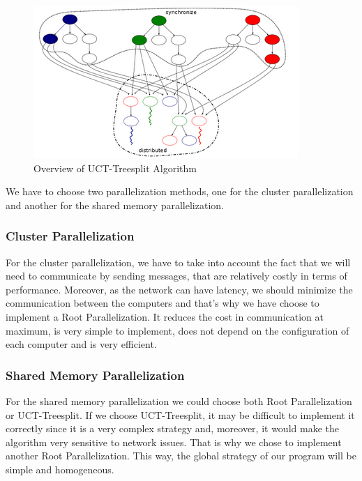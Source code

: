 \begin{figure}[!h] 
\centerline{\includegraphics[scale=0.80]{3Methods/3.1Parallelization_Method/treesplit.png}}
   \caption{Overview of UCT-Treesplit Algorithm}
\label{fig:treesplit}
\end{figure}


We have to choose two parallelization methods, one for the cluster parallelization and another for the shared memory parallelization.
\subsubsection{Cluster Parallelization}
For the cluster parallelization, we have to take into account the fact that we will need to communicate by sending messages, that are relatively costly in terms of performance.
Moreover, as the network can have latency, we should minimize the communication between the computers and that's why we have choose to implement a Root Parallelization.
It reduces the cost in communication at maximum, is very simple to implement, does not depend on the configuration of each computer and is very efficient.
\subsubsection{Shared Memory Parallelization}
For the shared memory parallelization we could choose both Root Parallelization or UCT-Treesplit.
If we choose UCT-Treesplit, it may be difficult to implement it correctly since it is a very complex strategy and, moreover, it would make the algorithm very sensitive to network issues. That is why we chose to implement another Root Parallelization. This way, the global strategy of our program will be simple and homogeneous.
